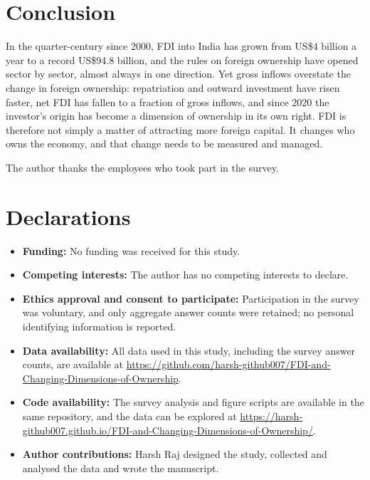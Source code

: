 \documentclass[sn-basic]{sn-jnl}
\newcommand{\USD}{US\$}
\begin{document}
\section{Conclusion}\label{sec:conclusion}

In the quarter-century since 2000, FDI into India has grown from \USD 4 billion a year to a record \USD 94.8 billion, and the rules on foreign ownership have opened sector by sector, almost always in one direction. Yet gross inflows overstate the change in foreign ownership: repatriation and outward investment have risen faster, net FDI has fallen to a fraction of gross inflows, and since 2020 the investor's origin has become a dimension of ownership in its own right. FDI is therefore not simply a matter of attracting more foreign capital. It changes who owns the economy, and that change needs to be measured and managed.

\backmatter

The author thanks the employees who took part in the survey.

\section*{Declarations}

\begin{itemize}
\item \textbf{Funding:} No funding was received for this study.
\item \textbf{Competing interests:} The author has no competing interests to declare.
\item \textbf{Ethics approval and consent to participate:} Participation in the survey was voluntary, and only aggregate answer counts were retained; no personal identifying information is reported.
\item \textbf{Data availability:} All data used in this study, including the survey answer counts, are available at \url{https://github.com/harsh-github007/FDI-and-Changing-Dimensions-of-Ownership}.
\item \textbf{Code availability:} The survey analysis and figure scripts are available in the same repository, and the data can be explored at \url{https://harsh-github007.github.io/FDI-and-Changing-Dimensions-of-Ownership/}.
\item \textbf{Author contributions:} Harsh Raj designed the study, collected and analysed the data and wrote the manuscript.
\end{itemize}
\end{document}
